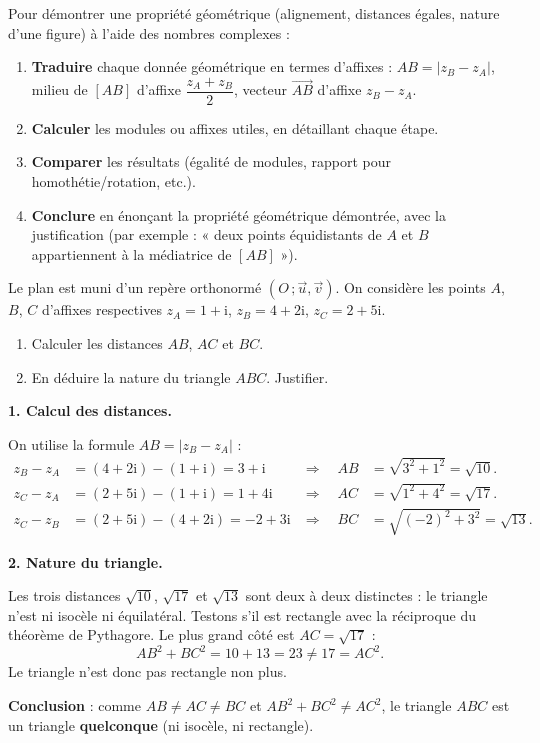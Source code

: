 \documentclass[11pt]{article}
\begin{document}
\begin{methode}
Pour démontrer une propriété géométrique (alignement, distances égales, nature d'une figure) à l'aide des nombres complexes :
\begin{enumerate}
\item \textbf{Traduire} chaque donnée géométrique en termes d'affixes : $AB = |z_B - z_A|$, milieu de $[AB]$ d'affixe $\dfrac{z_A + z_B}{2}$, vecteur $\overrightarrow{AB}$ d'affixe $z_B - z_A$.
\item \textbf{Calculer} les modules ou affixes utiles, en détaillant chaque étape.
\item \textbf{Comparer} les résultats (égalité de modules, rapport pour homothétie/rotation, etc.).
\item \textbf{Conclure} en énonçant la propriété géométrique démontrée, avec la justification (par exemple : « deux points équidistants de $A$ et $B$ appartiennent à la médiatrice de $[AB]$ »).
\end{enumerate}
\end{methode}

\begin{exoresolu}
Le plan est muni d'un repère orthonormé $(O\,;\vec{u},\vec{v})$. On considère les points $A$, $B$, $C$ d'affixes respectives $z_A = 1 + \mathrm{i}$, $z_B = 4 + 2\mathrm{i}$, $z_C = 2 + 5\mathrm{i}$.
\begin{enumerate}
\item Calculer les distances $AB$, $AC$ et $BC$.
\item En déduire la nature du triangle $ABC$. Justifier.
\end{enumerate}
\tcblower
\textbf{1. Calcul des distances.}

On utilise la formule $AB = |z_B - z_A|$ :
\begin{align*}
z_B - z_A &= (4 + 2\mathrm{i}) - (1 + \mathrm{i}) = 3 + \mathrm{i} &\Rightarrow\quad AB &= \sqrt{3^2 + 1^2} = \sqrt{10}.\\
z_C - z_A &= (2 + 5\mathrm{i}) - (1 + \mathrm{i}) = 1 + 4\mathrm{i} &\Rightarrow\quad AC &= \sqrt{1^2 + 4^2} = \sqrt{17}.\\
z_C - z_B &= (2 + 5\mathrm{i}) - (4 + 2\mathrm{i}) = -2 + 3\mathrm{i} &\Rightarrow\quad BC &= \sqrt{(-2)^2 + 3^2} = \sqrt{13}.
\end{align*}

\textbf{2. Nature du triangle.}

Les trois distances $\sqrt{10}$, $\sqrt{17}$ et $\sqrt{13}$ sont deux à deux distinctes : le triangle n'est ni isocèle ni équilatéral. Testons s'il est rectangle avec la réciproque du théorème de Pythagore. Le plus grand côté est $AC = \sqrt{17}$ :
\[AB^2 + BC^2 = 10 + 13 = 23 \neq 17 = AC^2.\]
Le triangle n'est donc pas rectangle non plus.

\textbf{Conclusion} : comme $AB \neq AC \neq BC$ et $AB^2 + BC^2 \neq AC^2$, le triangle $ABC$ est un triangle \textbf{quelconque} (ni isocèle, ni rectangle).
\end{exoresolu}
\end{document}
